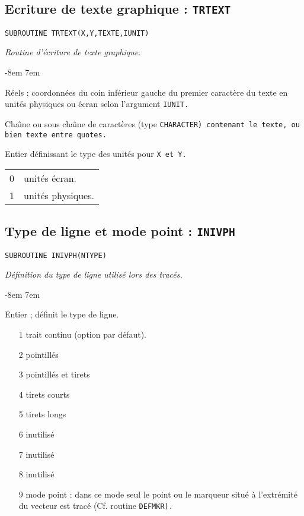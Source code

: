 \documentclass[a4paper,12pt,titlepage]{article}
\newcommand{\darg}[1]{\item[\tt #1\rm]}
\newcommand{\fsub}[1]{\hbox {\tt SUBROUTINE #1  } \medskip }
\newenvironment{argdesc}{\begin{list}{-}{\leftmargin 8em \labelwidth 7em}}%
{\end{list}}
\begin{document}
\subsection{Ecriture de texte graphique : \tt TRTEXT}
\fsub{TRTEXT(X,Y,TEXTE,IUNIT)}

    \em Routine d'\'ecriture de texte graphique.\em

\begin{argdesc}
    \darg{X,Y :} R\'eels ;   coordonn\'ees  du  coin  inf\'erieur  gauche  du 
              premier  caract\`ere du texte en unit\'es  physi\-ques  ou 
              \'ecran selon l'argument \tt IUNIT\rm.
    \darg{TEXTE :} Cha\^{\i}ne ou sous cha\^{\i}ne de caract\`eres 
                (type \tt CHARACTER\rm ) 
              contenant le texte, ou bien texte entre quotes.
    \darg{IUNIT :} Entier  d\'efinissant le type des unit\'es pour 
                           \tt X\rm\ et  \tt Y\rm. 

              \begin{center}\begin{tabular}{ll}
              0 &   unit\'es \'ecran.\\
              1 &   unit\'es physiques.\\
              \end{tabular}\end{center}
\end{argdesc}

\subsection{Type de ligne et mode point : \tt  INIVPH}
\fsub{INIVPH(NTYPE)}

    \em D\'efinition du type de ligne utilis\'e lors des trac\'es.\em

\begin{argdesc}
    \darg{NTYPE :} Entier ;  d\'efinit le type de ligne.

              \begin{itemize}
              \item[1]    trait continu (option par d\'efaut).
              \item[2]    pointill\'es
              \item[3]    pointill\'es et tirets
              \item[4]    tirets courts
              \item[5]    tirets longs
              \item[6]    inutilis\'e
              \item[7]    inutilis\'e
              \item[8]    inutilis\'e
              \item[9]    mode  point :   dans ce mode seul le point ou  le 
                   marqueur situ\'e \`a l'extr\'emit\'e du vecteur est
		   trac\'e (Cf. routine \tt DEFMKR\rm).
              \end{itemize}
\end{argdesc}
\end{document}
